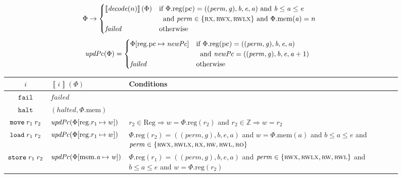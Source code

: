\documentclass[format=acmsmall, review=true, screen=true]{acmart}
\newcommand{\update}[2]{[#1 \mapsto #2]}
\newcommand{\sem}[1]{\left\llbracket #1 \right\rrbracket}
\newcommand{\var}[1]{\mathit{#1}}
\newcommand{\gl}{\var{g}}
\newcommand{\pcreg}{\mathrm{pc}}
\newcommand{\addr}{\var{a}}
\newcommand{\start}{\var{b}}
\newcommand{\addrend}{\var{e}}
\newcommand{\perm}{\var{perm}}
\newcommand{\stdcap}[1][(\perm,\gl)]{\left(#1,\start,\addrend,\addr \right)}
\newcommand{\plainproj}[1]{\mathrm{#1}}
\newcommand{\memheap}[1][\Phi]{#1.\plainproj{mem}}
\newcommand{\memreg}[1][\Phi]{#1.\plainproj{reg}}
\newcommand{\updateHeap}[3][\Phi]{#1\update{\plainproj{mem}.#2}{#3}}
\newcommand{\updateReg}[3][\Phi]{#1\update{\plainproj{reg}.#2}{#3}}
\newcommand{\failed}{\mathit{failed}}
\newcommand{\halted}{\mathit{halted}}
\newcommand{\plainfun}[2]{
  \ifthenelse{\equal{#2}{}}
  {\mathit{#1}}
  {\mathit{#1}(#2)}
}
\newcommand{\decode}{\plainfun{decode}{}}
\newcommand{\stdUpdatePc}[1]{\plainfun{updPc}{#1}}
\newcommand{\plaindom}[1]{\mathrm{#1}}
\newcommand{\Regs}{\plaindom{Reg}}
\newcommand{\ints}{\mathbb{Z}}
\newcommand{\refreg}[1]{#1}
\newcommand{\refheap}[1]{#1}
\newcommand{\zinstr}[1]{\mathtt{#1}}
\newcommand{\fail}{\zinstr{fail}}
\newcommand{\halt}{\zinstr{halt}}
\newcommand{\twoinstr}[3]{
  \ifthenelse{\equal{#2#3}{}}
  {\zinstr{#1}}
  {\zinstr{#1} \; #2 \; #3}
}
\newcommand{\move}[2]{\twoinstr{move}{#1}{#2}}
\newcommand{\store}[2]{\twoinstr{store}{#1}{#2}}
\newcommand{\load}[2]{\twoinstr{load}{#1}{#2}}
\newcommand{\plainperm}[1]{\textsc{#1}}
\newcommand{\readonly}{\plainperm{ro}}
\newcommand{\readwrite}{\plainperm{rw}}
\newcommand{\exec}{\plainperm{rx}}
\newcommand{\rwx}{\plainperm{rwx}}
\newcommand{\readwritel}{\plainperm{rwl}}
\newcommand{\rwlx}{\plainperm{rwlx}}
\begin{document}
\begin{figure}[htb]
  \centering
  \begin{equation*}
    \Phi  \rightarrow
    \begin{cases}
      \sem{\decode(n)}(\Phi) & \arraycolsep=0pt
      \begin{array}[t]{l}
        \text{if $\memreg(\pcreg) = \stdcap$ and $\start \leq \addr \leq \addrend$}\\ 
        \text{\;\;and $\perm \in \{ \exec,\rwx, \rwlx \}$ and $\memheap(\addr) = n$ }
      \end{array}
\\
      \failed                                 & \text{otherwise}
    \end{cases}
  \end{equation*}
  \begin{align*}
    \stdUpdatePc{\Phi} &=
                         \begin{cases}
                           \updateReg{\pcreg}{\var{newPc}} & \arraycolsep=0pt
                           \begin{array}[t]{l}
                             \text{if $\memreg(\pcreg) = \stdcap$}\\
                             \text{\;\;and $\var{newPc} = ((\perm,\gl),\start,\addrend,\addr + 1)$}
                           \end{array}
\\
                             \failed & \text{otherwise}
                         \end{cases}
  \end{align*}
  \begin{tabular}{|c|p{3.4cm}|>{\raggedright\arraybackslash}p{7.3cm}|}
    \hline
    $i$&$\sem{i}(\Phi)$&Conditions\\
    \hline 
    $\fail$&$\failed$&\\
    \hline
    $\halt$&$(\halted,\memheap)$&\\
    \hline
    $\move{\refreg{r_1}}{r_2}$& $\stdUpdatePc{}(\updateReg{r_1}{w})$&$r_2 \in \Regs \Rightarrow w = \memreg(r_2)$ and $r_2 \in \ints \Rightarrow w = r_2$\\
    \hline
    $\load{\refreg{r_1}}{\refheap{r_2}}$&$\stdUpdatePc{\updateReg{r_1}{w}}$&$\memreg(r_2) = \stdcap{}$ and  $w = \memheap(\addr)$ and $\start \leq \addr \leq \addrend$ and $\perm \in \{ \rwx, \rwlx, \exec, \readwrite, \readwritel, \readonly \}$ \\
    \hline
    $\store{\refheap{r_1}}{\refreg{r_2}}$&$\stdUpdatePc{\updateHeap{\addr}{\var{w}}}$&$\memreg(r_1) = \stdcap$ and $\perm \in \{ \rwx, \rwlx, \readwrite, \readwritel\}$  and $\start \leq \addr \leq \addrend$ and $\var{w} = \memreg(r_2)$

\end{tabular}
\end{figure}
\end{document}
